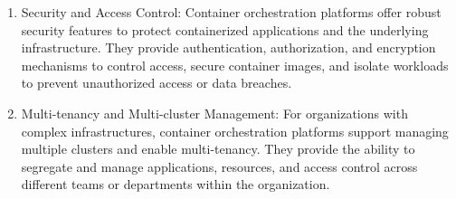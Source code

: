 \begin{enumerate}
    \item Security and Access Control: Container orchestration platforms offer robust security features to protect containerized applications and the underlying infrastructure. They provide authentication, authorization, and encryption mechanisms to control access, secure container images, and isolate workloads to prevent unauthorized access or data breaches.

    \item Multi-tenancy and Multi-cluster Management: For organizations with complex infrastructures, container orchestration platforms support managing multiple clusters and enable multi-tenancy. They provide the ability to segregate and manage applications, resources, and access control across different teams or departments within the organization.
\end{enumerate}

